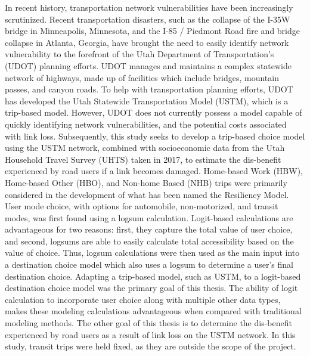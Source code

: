 \afterpage{\cleardoublepage}

In recent history, transportation network vulnerabilities have been increasingly
scrutinized. Recent transportation disasters, such as the collapse of the I-35W
bridge in Minneapolis, Minnesota, and the I-85 / Piedmont Road fire
and bridge collapse in Atlanta, Georgia, have brought the need to easily identify
network vulnerability to the forefront of the Utah Department of Transportation's
(UDOT) planning efforts. UDOT manages and maintains a complex statewide network of highways,
made up of facilities which include bridges, mountain passes, and canyon roads.
To help with transportation planning efforts, UDOT has developed the Utah
Statewide Transportation Model (USTM), which is a trip-based model. However,
UDOT does not currently possess a model capable of quickly identifying network
vulnerabilities, and the potential costs associated with link loss.
Subsequently, this study seeks to develop a trip-based
choice model using the USTM network, combined
with socioeconomic data from the Utah Household Travel Survey (UHTS) taken in
2017, to estimate the dis-benefit experienced by road users if a link becomes
damaged. Home-based Work (HBW), Home-based Other (HBO), and Non-home Based (NHB)
trips were primarily considered in the development of what has been named the
Resiliency Model. User mode
choice, with options for automobile, non-motorized, and transit modes, was first
found using a logsum calculation. Logit-based calculations are advantageous for two reasons: first,
they capture the total value of user choice, and second, logsums are able to easily
calculate total accessibility based on the value of choice. Thus, logsum
calculations were then used as the main
input into a destination choice model which also uses a logsum to
determine a user's final destination choice. Adapting a trip-based model,
such as USTM, to a logit-based destination choice model was the primary goal of
this thesis. The ability of logit calculation to incorporate user choice along
with multiple other data types, makes these modeling calculations advantageous
when compared with
traditional modeling methods. The other goal of this thesis is to determine the
dis-benefit experienced by road users as a result of link loss on the USTM
network. In this study, transit trips were held
fixed, as they are outside the scope of the project.
